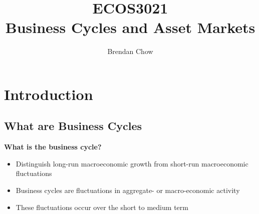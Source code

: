 \documentclass[a4paper]{article}
\begin{document}
\title{{ECOS3021}\\{\normalsize{Business Cycles and Asset Markets}}}
	\author{Brendan Chow}
	\maketitle
	\newpage
	\pagestyle{fancynotes}

\section{Introduction}\label{Sec:1}
\subsection{What are Business Cycles}
	\textbf{What is the business cycle?}
	\begin{itemize}
		\item Distinguish \textcolor{myred}{long-run} macroeconomic \textcolor{myred}{growth} from \textcolor{myblue}{short-run} macroeconomic \textcolor{myblue}{fluctuations}
		\item Business cycles are \textcolor{myblue}{fluctuations} in aggregate- or macro-economic activity
		\item These fluctuations occur over the \textcolor{myblue}{short to medium} term
	\end{itemize}
\end{document}

